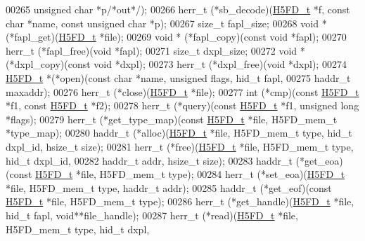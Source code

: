 \begin{DoxyCode}
00265                          \textcolor{keywordtype}{unsigned} \textcolor{keywordtype}{char} *p\textcolor{comment}{/*out*/});
00266     herr\_t  (*sb\_decode)(\hyperlink{struct_h5_f_d__t}{H5FD\_t} *f, \textcolor{keyword}{const} \textcolor{keywordtype}{char} *name, \textcolor{keyword}{const} \textcolor{keywordtype}{unsigned} \textcolor{keywordtype}{char} *p);
00267     \textcolor{keywordtype}{size\_t}  fapl\_size;
00268     \textcolor{keywordtype}{void} *  (*fapl\_get)(\hyperlink{struct_h5_f_d__t}{H5FD\_t} *file);
00269     \textcolor{keywordtype}{void} *  (*fapl\_copy)(\textcolor{keyword}{const} \textcolor{keywordtype}{void} *fapl);
00270     herr\_t  (*fapl\_free)(\textcolor{keywordtype}{void} *fapl);
00271     \textcolor{keywordtype}{size\_t}  dxpl\_size;
00272     \textcolor{keywordtype}{void} *  (*dxpl\_copy)(\textcolor{keyword}{const} \textcolor{keywordtype}{void} *dxpl);
00273     herr\_t  (*dxpl\_free)(\textcolor{keywordtype}{void} *dxpl);
00274     \hyperlink{struct_h5_f_d__t}{H5FD\_t} *(*open)(\textcolor{keyword}{const} \textcolor{keywordtype}{char} *name, \textcolor{keywordtype}{unsigned} flags, hid\_t fapl,
00275                     haddr\_t maxaddr);
00276     herr\_t  (*close)(\hyperlink{struct_h5_f_d__t}{H5FD\_t} *file);
00277     int     (*cmp)(\textcolor{keyword}{const} \hyperlink{struct_h5_f_d__t}{H5FD\_t} *f1, \textcolor{keyword}{const} \hyperlink{struct_h5_f_d__t}{H5FD\_t} *f2);
00278     herr\_t  (*query)(\textcolor{keyword}{const} \hyperlink{struct_h5_f_d__t}{H5FD\_t} *f1, \textcolor{keywordtype}{unsigned} \textcolor{keywordtype}{long} *flags);
00279     herr\_t  (*get\_type\_map)(\textcolor{keyword}{const} \hyperlink{struct_h5_f_d__t}{H5FD\_t} *file, H5FD\_mem\_t *type\_map);
00280     haddr\_t (*alloc)(\hyperlink{struct_h5_f_d__t}{H5FD\_t} *file, H5FD\_mem\_t type, hid\_t dxpl\_id, hsize\_t size);
00281     herr\_t  (*free)(\hyperlink{struct_h5_f_d__t}{H5FD\_t} *file, H5FD\_mem\_t type, hid\_t dxpl\_id,
00282                     haddr\_t addr, hsize\_t size);
00283     haddr\_t (*get\_eoa)(\textcolor{keyword}{const} \hyperlink{struct_h5_f_d__t}{H5FD\_t} *file, H5FD\_mem\_t type);
00284     herr\_t  (*set\_eoa)(\hyperlink{struct_h5_f_d__t}{H5FD\_t} *file, H5FD\_mem\_t type, haddr\_t addr);
00285     haddr\_t (*get\_eof)(\textcolor{keyword}{const} \hyperlink{struct_h5_f_d__t}{H5FD\_t} *file, H5FD\_mem\_t type);
00286     herr\_t  (*get\_handle)(\hyperlink{struct_h5_f_d__t}{H5FD\_t} *file, hid\_t fapl, \textcolor{keywordtype}{void}**file\_handle);
00287     herr\_t  (*read)(\hyperlink{struct_h5_f_d__t}{H5FD\_t} *file, H5FD\_mem\_t type, hid\_t dxpl,

\end{DoxyCode}
